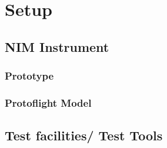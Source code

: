 \section{Setup}\label{sec:setup}
	\begin{comment}
	The goal of this chapter is to show NIM in the current lab equipment. An 'as is' state.
	Instrument in vacuum chamber. Mechanical description. Theoretical description is in the theory part.
	IS based on the design of Abplanalp 2009 if so. Look it up for NIM.
	With which IS, reflectron, detector. Short description of the different parts as they were for the first tests. (IS, reflectron, detector type). With pictures.
	Lab electronics, cabling? Or just reference to Stefan's Diss? Used standard settings such a pulser timings, UMCP, filament emission current, chamber pressure.
	(will also be mentioned in chamber experiments for the different settings)
	
	\end{comment}
	
	\subsection{NIM Instrument}\label{subsec:setupInst}
		\subsubsection{Prototype}
		\begin{comment}
		IS with 8 lenses and one filament holder (flight 7 lenses, 2 filament holders)
		small antechamber with edge, one entrance hole at 90° (fight 80mm diam., 2 holes at +-60° relative to normal)
		Prototype reflectron with ring electrodes (flight has 3 electrodes with a linear increasing resistance in between them)
		Pulser: lab pulser (flight still under development -> tests later)
		\end{comment}
		
		\subsubsection{Protoflight Model}
	
	\subsection{Test facilities/ Test Tools}\label{subsec:setupTestTools} %
	
